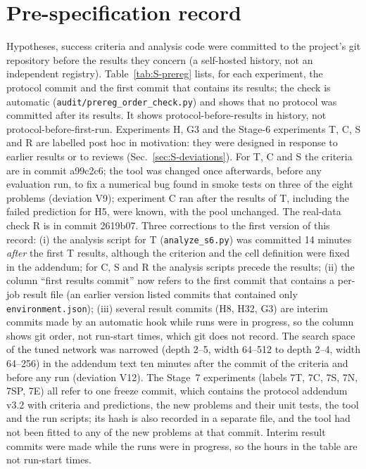 \documentclass[preprint,11pt]{elsarticle}
\begin{document}
\section{Pre-specification record}\label{sec:S-prereg}
Hypotheses, success criteria and analysis code were committed to the project's git repository before the results they concern (a self-hosted history, not an independent registry). Table~\ref{tab:S-prereg} lists, for each experiment, the protocol commit and the first commit that contains its results; the check is automatic (\texttt{audit/prereg\_order\_check.py}) and shows that no protocol was committed after its results. It shows protocol-before-results in history, not protocol-before-first-run. Experiments H, G3 and the Stage-6 experiments T, C, S and R are labelled post hoc in motivation: they were designed in response to earlier results or to reviews (Sec.~\ref{sec:S-deviations}). For T, C and S the criteria are in commit a99c2c6; the tool was changed once afterwards, before any evaluation run, to fix a numerical bug found in smoke tests on three of the eight problems (deviation V9); experiment C ran after the results of T, including the failed prediction for H5, were known, with the pool unchanged. The real-data check R is in commit 2619b07. Three corrections to the first version of this record: (i) the analysis script for T (\texttt{analyze\_s6.py}) was committed 14 minutes \emph{after} the first T results, although the criterion and the cell definition were fixed in the addendum; for C, S and R the analysis scripts precede the results; (ii) the column ``first results commit'' now refers to the first commit that contains a per-job result file (an earlier version listed commits that contained only \texttt{environment.json}); (iii) several result commits (H8, H32, G3) are interim commits made by an automatic hook while runs were in progress, so the column shows git order, not run-start times, which git does not record. The search space of the tuned network was narrowed (depth 2--5, width 64--512 to depth 2--4, width 64--256) in the addendum text ten minutes after the commit of the criteria and before any run (deviation V12). The Stage~7 experiments (labels 7T, 7C, 7S, 7N, 7SP, 7E) all refer to one freeze commit, which contains the protocol addendum v3.2 with criteria and predictions, the new problems and their unit tests, the tool and the run scripts; its hash is also recorded in a separate file, and the tool had not been fitted to any of the new problems at that commit. Interim result commits were made while the runs were in progress, so the hours in the table are not run-start times.
\begin{table}[h]\centering\caption{Order of pre-specification and results commits.}\label{tab:S-prereg}\small\resizebox{\textwidth}{!}{}\end{table}
\end{document}
